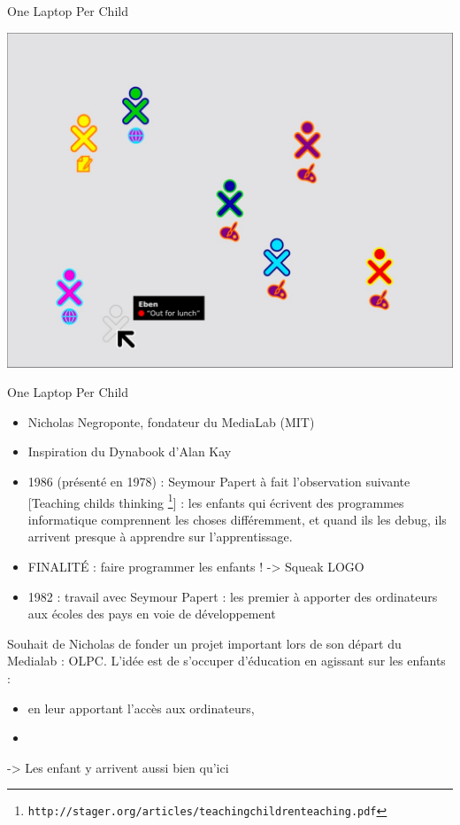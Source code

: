 \begin{frame}{One Laptop Per Child}
\begin{center}
{\includegraphics[width=.8\textwidth]{../resources/illustrations/olpc_mesh}}
\end{center}
\end{frame}

\begin{frame}{One Laptop Per Child}
  \begin{itemize}
   \item Nicholas  Negroponte, fondateur du MediaLab (MIT)
   \item Inspiration du Dynabook d'Alan Kay
   \item 1986 (présenté en 1978) : Seymour Papert à fait l'observation suivante [Teaching childs thinking \footnote{\texttt{http://stager.org/articles/teachingchildrenteaching.pdf}}] : les enfants qui écrivent des programmes informatique comprennent les choses différemment, et quand ils les debug, ils arrivent presque à apprendre sur l'apprentissage.
   \item FINALITÉ : faire programmer les enfants ! -> Squeak LOGO 
   \item 1982 : travail avec Seymour Papert : les premier à apporter des ordinateurs aux écoles des pays en voie de développement
  \end{itemize}
  Souhait de Nicholas de fonder un projet important lors de son départ du Medialab : OLPC. L'idée est de s'occuper d'éducation en agissant sur les enfants :
  \begin{itemize}
  \item en leur apportant l'accès aux ordinateurs,
  \item 
  \end{itemize}
  -> Les enfant y arrivent aussi bien qu'ici
\end{frame}

